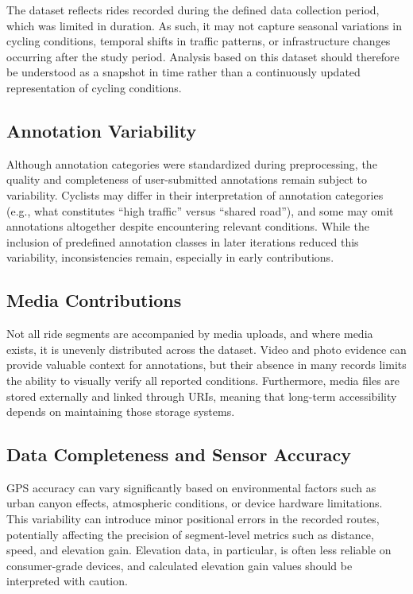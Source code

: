 The dataset reflects rides recorded during the defined data collection period, which was limited in duration. As such, it may not capture seasonal variations in cycling conditions, temporal shifts in traffic patterns, or infrastructure changes occurring after the study period. Analysis based on this dataset should therefore be understood as a snapshot in time rather than a continuously updated representation of cycling conditions.

\subsection{Annotation Variability}

Although annotation categories were standardized during preprocessing, the quality and completeness of user-submitted annotations remain subject to variability. Cyclists may differ in their interpretation of annotation categories (e.g., what constitutes “high traffic” versus “shared road”), and some may omit annotations altogether despite encountering relevant conditions. While the inclusion of predefined annotation classes in later iterations reduced this variability, inconsistencies remain, especially in early contributions.

\subsection{Media Contributions}

Not all ride segments are accompanied by media uploads, and where media exists, it is unevenly distributed across the dataset. Video and photo evidence can provide valuable context for annotations, but their absence in many records limits the ability to visually verify all reported conditions. Furthermore, media files are stored externally and linked through URIs, meaning that long-term accessibility depends on maintaining those storage systems.

\subsection{Data Completeness and Sensor Accuracy}

GPS accuracy can vary significantly based on environmental factors such as urban canyon effects, atmospheric conditions, or device hardware limitations. This variability can introduce minor positional errors in the recorded routes, potentially affecting the precision of segment-level metrics such as distance, speed, and elevation gain. Elevation data, in particular, is often less reliable on consumer-grade devices, and calculated elevation gain values should be interpreted with caution.

